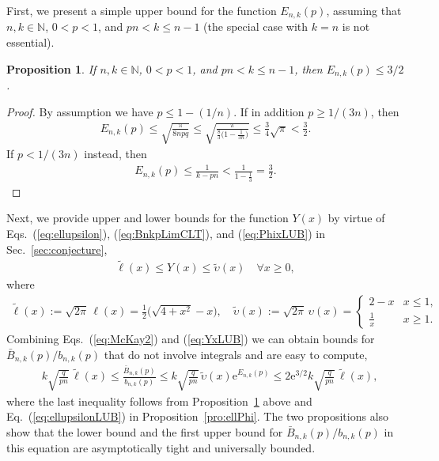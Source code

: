 \documentclass[aop]{imsart}
\theoremstyle{plain}
\newtheorem{proposition}[theorem]{Proposition}
\theoremstyle{remark}
\newcommand{\rme}{\mathrm{e}}
\newcommand{\bbN}{\mathbb{N}}
\newcommand{\1}{\operatorname{\uppercase\expandafter{\romannumeral1}}}
\newcommand{\2}{\operatorname{\uppercase\expandafter{\romannumeral2}}}
\newcommand{\3}{\operatorname{\uppercase\expandafter{\romannumeral3}}}
\newcommand{\4}{\operatorname{\uppercase\expandafter{\romannumeral4}}}
\newcommand{\5}{\operatorname{\uppercase\expandafter{\romannumeral5}}}
\newcommand{\6}{\operatorname{\uppercase\expandafter{\romannumeral6}}}
\newcommand{\7}{\operatorname{\uppercase\expandafter{\romannumeral7}}}
\newcommand{\8}{\operatorname{\uppercase\expandafter{\romannumeral8}}}
\newcommand{\9}{\operatorname{\uppercase\expandafter{\romannumeral9}}}
\newcommand{\eref}[1]{Eq.~\textup{(\ref{#1})}}
\newcommand{\eqsref}[2]{Eqs.~(\ref{#1}) and (\ref{#2})}
\newcommand{\eqssref}[3]{Eqs.~(\ref{#1}), (\ref{#2}), and (\ref{#3})}
\newcommand{\pref}[1]{Proposition~\ref{#1}}
\newcommand{\sref}[1]{Sec.~\ref{#1}}
\begin{document}
\begin{appendix}
First, we present a simple upper bound for  the function $E_{n,k}(p)$,  assuming that $n,k\in \bbN$, $0<p<1$, and $pn<k\leq n-1$ (the special case with $k=n$ is not essential).
\begin{proposition}\label{pro:Enkp}
	If $n,k\in \bbN$, $0<p<1$, and $pn< k\leq n-1$, then $E_{n,k}(p)\leq 3/2$. 
\end{proposition}
\begin{proof}
	By assumption we have $p\leq 1-(1/n)$.  If in addition $p\geq 1/(3n)$, then 
	\begin{align}
	E_{n,k}(p)\leq \sqrt{\frac{\pi}{8npq}}\leq \sqrt{\frac{\pi}{\frac{8}{3}\bigl(1-\frac{1}{3n}\bigr)}}\leq \frac{3}{4}\sqrt{\pi}<\frac{3}{2}. 
	\end{align}
	If $p<1/(3n)$ instead, then 
	\begin{align}
	E_{n,k}(p)\leq \frac{1}{k-pn}< \frac{1}{1-\frac{1}{3}}=\frac{3}{2}.
	\end{align}
\end{proof}

Next, we provide upper and lower bounds for the function $Y(x)$ by virtue of   \eqssref{eq:ellupsilon}{eq:BnkpLimCLT}{eq:PhixLUB} in \sref{sec:conjecture},  
\begin{align}\label{eq:YxLUB}
\tilde{\ell}(x)\leq Y(x)\leq \tilde{\upsilon}(x) \quad \forall x\geq 0,
\end{align}
where 
\begin{align}
\tilde{\ell}(x):=\sqrt{2\pi}\,\ell(x)=\frac{1}{2} \bigl(\sqrt{4 + x^2}-x\bigr), \quad \tilde{\upsilon}(x):=\sqrt{2\pi}\,\upsilon(x)=\begin{cases}
2-x & x\leq 1,\\
\frac{1}{x} &x\geq 1.
\end{cases}
\end{align}
Combining \eqsref{eq:McKay2}{eq:YxLUB} we can obtain bounds for $\bar{B}_{n,k}(p)/b_{n,k}(p)$ that do not involve integrals and are easy to compute, 
\begin{align}
&k\sqrt{\frac{q}{pn}}\, \tilde{\ell}(x)
\le \frac{\bar{B}_{n,k}(p)}{b_{n,k}(p)} \le k\sqrt{\frac{q}{pn}}\, \tilde{\upsilon}(x) \rme^{E_{n,k}(p)}\leq 2\rme^{3/2}k\sqrt{\frac{q}{pn}}\, \tilde{\ell}(x), 
\end{align}	
where the last inequality follows from \pref{pro:Enkp} above and \eref{eq:ellupsilonLUB} in \pref{pro:ellPhi}. The two propositions also show that the lower bound and the first upper bound for $\bar{B}_{n,k}(p)/b_{n,k}(p)$ in this equation are asymptotically tight and  universally bounded. 



\end{appendix}
\end{document}
